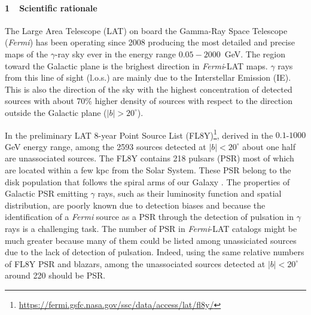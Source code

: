 \documentclass[12pt,twoside,letterpaper,onecolumn,english]{article}
\begin{document}





\paragraph{1\ \ Scientific rationale}
\label{sec:intro}
The Large Area Telescope (LAT) on board the Gamma-Ray Space Telescope
({\it Fermi}) has been operating since 2008 producing the most detailed and precise maps of the $\gamma$-ray sky ever in the energy range $0.05-2000$~GeV.
The region toward the Galactic plane is the brighest direction in {\it Fermi}-LAT maps. $\gamma$ rays from this line of sight (l.o.s.) are mainly due to the Interstellar Emission (IE).
This is also the direction of the sky with the highest concentration of detected sources with about 70\% higher density of sources with respect to the direction outside the Galactic plane ($|b|>20^{\circ}$).

In the preliminary LAT 8-year Point Source List (FL8Y)\footnote{\url{https://fermi.gsfc.nasa.gov/ssc/data/access/lat/fl8y/}}, derived in the $0.1$-$1000$ GeV energy range, among the 2593 sources detected at $|b|<20^{\circ}$ about one half are unassociated sources.
The FL8Y contains 218 pulsars (PSR) most of which are located within a few kpc from the Solar System. These PSR belong to the disk population that follows the spiral arms of our Galaxy \cite{TheFermi-LAT:2013ssa}.
The properties of Galactic PSR emitting $\gamma$ rays, such as their luminosity function and spatial distribution, are poorly known due to detection biases and because the identification of a {\it Fermi} source as a PSR through the detection of pulsation in $\gamma$ rays is a challenging task.
The number of PSR in {\it Fermi}-LAT catalogs might be much greater because many of them could be listed among unassiciated sources due to the lack of detection of pulsation. Indeed, using the same relative numbers of FL8Y PSR and blazars, among the unassociated sources detected at $|b|<20^{\circ}$ around 220 should be PSR. 
\end{document}
